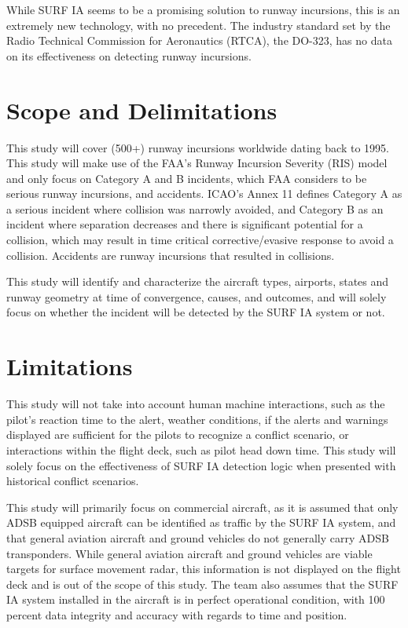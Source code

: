 While SURF IA seems to be a promising solution to runway incursions, this is an extremely new technology, with no precedent. The industry standard set by the Radio Technical Commission for Aeronautics (RTCA), the DO-323, has no data on its effectiveness on detecting runway incursions. 


\section{Scope and Delimitations}
\label{sec:bilder}

This study will cover (500+) runway incursions worldwide dating back to 1995. This study will make use of the FAA’s Runway Incursion Severity (RIS) model and only focus on Category A and B incidents, which FAA considers to be serious runway incursions, and accidents. ICAO's Annex 11 defines Category A as a serious incident where collision was narrowly avoided, and Category B as an incident where separation decreases and there is significant potential for a collision, which may result in time critical corrective/evasive response to avoid a collision. Accidents are runway incursions that resulted in collisions.

This study will identify and characterize the aircraft types, airports, states and runway geometry at time of convergence, causes, and outcomes, and will solely focus on whether the incident will be detected by the SURF IA system or not.






\section{Limitations}

This study will not take into account human machine interactions, such as the pilot's reaction time to the alert, weather conditions, if the alerts and warnings displayed are sufficient for the pilots to recognize a conflict scenario, or interactions within the flight deck, such as pilot head down time. This study will solely focus on the effectiveness of SURF IA detection logic when presented with historical conflict scenarios.

This study will primarily focus on commercial aircraft, as it is assumed that only ADSB equipped aircraft can be identified as traffic by the SURF IA system, and that general aviation aircraft and ground vehicles do not generally carry ADSB transponders. While general aviation aircraft and ground vehicles are viable targets for surface movement radar, this information is not displayed on the flight deck and is out of the scope of this study. The team also assumes that the SURF IA system installed in the aircraft is in perfect operational condition, with 100 percent data integrity and accuracy with regards to time and position.

